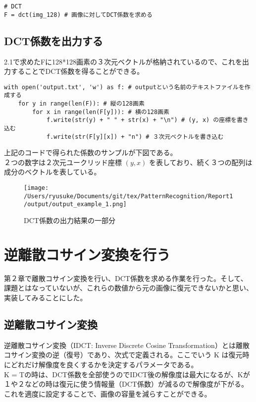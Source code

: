 \documentclass[dvipdfmx,uplatex]{jsarticle}
\begin{document}
\begin{spacing}{1.4}
\begin{lstlisting}[caption=DCT係数を求めるソースコード]
# DCT
F = dct(img_128) # 画像に対してDCT係数を求める

\end{lstlisting}

\subsection{DCT係数を出力する}
2.1で求めたFに128*128画素の３次元ベクトルが格納されているので、これを出力することでDCT係数を得ることができる。

\begin{lstlisting}[caption=DCT係数を出力するソースコード]
with open('output.txt', 'w') as f: # outputという名前のテキストファイルを作成する
    for y in range(len(F)): # 縦の128画素
        for x in range(len(F[y])): # 横の128画素
            f.write(str(y) + " " + str(x) + "\n") # (y, x) の座標を書き込む
            f.write(str(F[y][x]) + "n") # ３次元ベクトルを書き込む
\end{lstlisting}

上記のコードで得られた係数のサンプルが下図である。\\
２つの数字は２次元ユークリッド座標 $(y, x)$ を表しており、続く３つの配列は成分のベクトルを表している。
\begin{figure}[htbp]
\begin{center}
\texttt{[image: /Users/ryusuke/Documents/git/tex/PatternRecognition/Report1/output/output\_example\_1.png]}
\caption{DCT係数の出力結果の一部分}
\end{center}
\end{figure}

\newpage

\section{逆離散コサイン変換を行う}
第２章で離散コサイン変換を行い、DCT係数を求める作業を行った。そして、課題とはなっていないが、これらの数値から元の画像に復元できないかと思い、実装してみることにした。
\subsection{逆離散コサイン変換}
逆離散コサイン変換（IDCT: Inverse Discrete Cosine Transformation）とは離散コサイン変換の逆（復号）であり、次式で定義される。ここでいう K は復元時にどれだけ解像度を良くするかを決定するパラメータである。\\
K = Tの時は、DCT係数を全部使うのでIDCT後の解像度は最大になるが、Kが１や２などの時は復元に使う情報量（DCT係数）が減るので解像度が下がる。これを適度に設定することで、画像の容量を減らすことができる。\\


\end{spacing}
\end{document}
